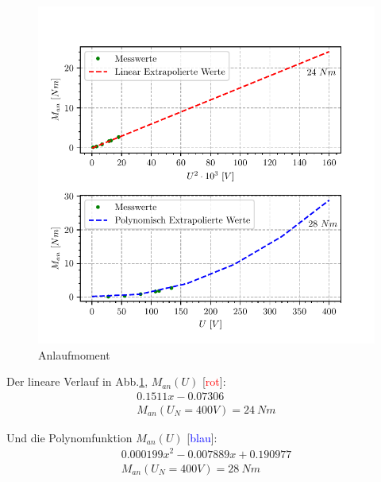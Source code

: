 \documentclass[conference]{IEEEtran}
\begin{document}
\vspace{-7ex}
\begin{figure}[htbp]
    \centering
    \includegraphics[width=\columnwidth]{./anlaufmoment.pdf}
    \caption{Anlaufmoment}
    \label{fig:Anlaufmoment}
\end{figure}

Der lineare Verlauf in Abb.\ref{fig:Anlaufmoment}, $M_{an}(U)$ [\textcolor{red}{rot}]:
\begin{gather*}
    0.1511 x - 0.07306 \\
    M_{an}(U_N=400V)=24\ Nm
\end{gather*}

Und die Polynomfunktion $M_{an}(U)$ [\textcolor{blue}{blau}]:
\begin{gather*}
    0.000199 x^2 -0.007889 x + 0.190977\\
    M_{an}(U_N=400V)=28\ Nm
\end{gather*}
\end{document}

